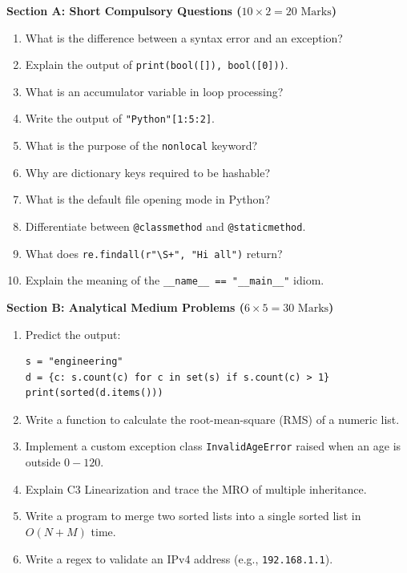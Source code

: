 \begin{mockexam}
\noindent\textbf{Section A: Short Compulsory Questions ($10 \times 2 = 20\text{ Marks}$)}
\begin{enumerate}[leftmargin=1.5em]
    \item What is the difference between a syntax error and an exception?
    \item Explain the output of \texttt{print(bool([]), bool([0]))}.
    \item What is an accumulator variable in loop processing?
    \item Write the output of \texttt{"Python"[1:5:2]}.
    \item What is the purpose of the \texttt{nonlocal} keyword?
    \item Why are dictionary keys required to be hashable?
    \item What is the default file opening mode in Python?
    \item Differentiate between \texttt{@classmethod} and \texttt{@staticmethod}.
    \item What does \texttt{re.findall(r"\textbackslash S+", "Hi all")} return?
    \item Explain the meaning of the \texttt{\_\_name\_\_ == "\_\_main\_\_"} idiom.
\end{enumerate}

\medskip
\noindent\textbf{Section B: Analytical Medium Problems ($6 \times 5 = 30\text{ Marks}$)}
\begin{enumerate}[leftmargin=1.5em, start=11]
    \item Predict the output:
    \begin{lstlisting}[language=Python3]
s = "engineering"
d = {c: s.count(c) for c in set(s) if s.count(c) > 1}
print(sorted(d.items()))
    \end{lstlisting}
    \item Write a function to calculate the root-mean-square (RMS) of a numeric list.
    \item Implement a custom exception class \texttt{InvalidAgeError} raised when an age is outside $0-120$.
    \item Explain C3 Linearization and trace the MRO of multiple inheritance.
    \item Write a program to merge two sorted lists into a single sorted list in $O(N+M)$ time.
    \item Write a regex to validate an IPv4 address (e.g., \texttt{192.168.1.1}).
\end{enumerate}


\end{mockexam}
